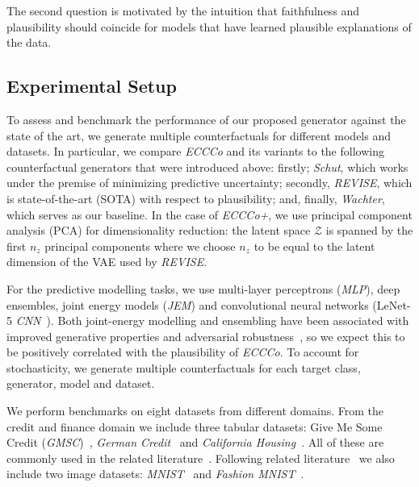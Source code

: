 \documentclass[letterpaper]{article} %
\begin{document}
The second question is motivated by the intuition that faithfulness and plausibility should coincide for models that have learned plausible explanations of the data.

\subsection{Experimental Setup}\label{emp:setup}

To assess and benchmark the performance of our proposed generator against the state of the art, we generate multiple counterfactuals for different models and datasets. In particular, we compare \textit{ECCCo} and its variants to the following counterfactual generators that were introduced above: firstly; \textit{Schut}, which works under the premise of minimizing predictive uncertainty; secondly, \textit{REVISE}, which is state-of-the-art (SOTA) with respect to plausibility; and, finally, \textit{Wachter}, which serves as our baseline. In the case of \textit{ECCCo+}, we use principal component analysis (PCA) for dimensionality reduction: the latent space $\mathcal{Z}$ is spanned by the first $n_z$ principal components where we choose $n_z$ to be equal to the latent dimension of the VAE used by \textit{REVISE}.

For the predictive modelling tasks, we use multi-layer perceptrons (\textit{MLP}), deep ensembles, joint energy models (\textit{JEM}) and convolutional neural networks (LeNet-5 \textit{CNN}~\citep{lecun1998gradient}). Both joint-energy modelling and ensembling have been associated with improved generative properties and adversarial robustness~\citep{grathwohl2020your,lakshminarayanan2016simple}, so we expect this to be positively correlated with the plausibility of \textit{ECCCo}. To account for stochasticity, we generate multiple counterfactuals for each target class, generator, model and dataset. 

We perform benchmarks on eight datasets from different domains. From the credit and finance domain we include three tabular datasets: Give Me Some Credit (\textit{GMSC})~\citep{kaggle2011give}, \textit{German Credit}~\citet{hoffman1994german} and \textit{California Housing}~\citet{pace1997sparse}. All of these are commonly used in the related literature~\citep{karimi2020survey,altmeyer2023endogenous,pawelczyk2021carla}. Following related literature~\citep{schut2021generating,dhurandhar2018explanations} we also include two image datasets: \textit{MNIST}~\citep{lecun1998mnist} and \textit{Fashion MNIST}~\citep{xiao2017fashion}. 
\end{document}
